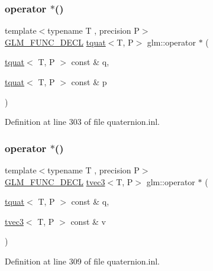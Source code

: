 \subsubsection{\texorpdfstring{operator $\ast$()}{operator *()}\hspace{0.1cm}{\footnotesize\ttfamily [1/7]}}
{\footnotesize\ttfamily template$<$typename T , precision P$>$ \\
\mbox{\hyperlink{setup_8hpp_ab2d052de21a70539923e9bcbf6e83a51}{G\+L\+M\+\_\+\+F\+U\+N\+C\+\_\+\+D\+E\+CL}} \mbox{\hyperlink{structglm_1_1tquat}{tquat}}$<$T, P$>$ glm\+::operator $\ast$ (\begin{DoxyParamCaption}\item[{\mbox{\hyperlink{structglm_1_1tquat}{tquat}}$<$ T, P $>$ const \&}]{q,  }\item[{\mbox{\hyperlink{structglm_1_1tquat}{tquat}}$<$ T, P $>$ const \&}]{p }\end{DoxyParamCaption})}



Definition at line 303 of file quaternion.\+inl.

\mbox{\label{group__gtc__quaternion_ga9899f835a115424e711bfd1e793a9df7}} 
\subsubsection{\texorpdfstring{operator $\ast$()}{operator *()}\hspace{0.1cm}{\footnotesize\ttfamily [2/7]}}
{\footnotesize\ttfamily template$<$typename T , precision P$>$ \\
\mbox{\hyperlink{setup_8hpp_ab2d052de21a70539923e9bcbf6e83a51}{G\+L\+M\+\_\+\+F\+U\+N\+C\+\_\+\+D\+E\+CL}} \mbox{\hyperlink{structglm_1_1tvec3}{tvec3}}$<$T, P$>$ glm\+::operator $\ast$ (\begin{DoxyParamCaption}\item[{\mbox{\hyperlink{structglm_1_1tquat}{tquat}}$<$ T, P $>$ const \&}]{q,  }\item[{\mbox{\hyperlink{structglm_1_1tvec3}{tvec3}}$<$ T, P $>$ const \&}]{v }\end{DoxyParamCaption})}



Definition at line 309 of file quaternion.\+inl.

\mbox{\label{group__gtc__quaternion_gaf630705b358b32f057587467fd0cca49}} 
